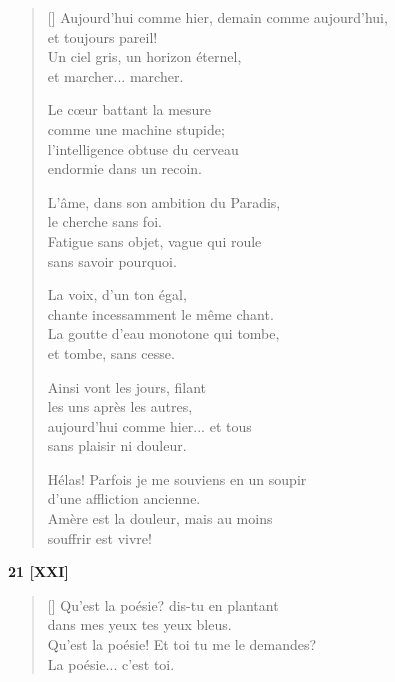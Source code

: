 \documentclass[a4paper,12pt]{book}
\begin{document}
\begin{verse}[\versewidth]
  Aujourd'hui comme hier, demain comme aujourd'hui, \\
  et toujours pareil! \\
  Un ciel gris, un horizon éternel, \\
  et marcher... marcher.

  Le cœur battant la mesure \\
  comme une machine stupide; \\
  l'intelligence obtuse du cerveau \\
  endormie dans un recoin.

  L'âme, dans son ambition du Paradis, \\
  le cherche sans foi. \\
  Fatigue sans objet, vague qui roule \\
  sans savoir pourquoi.

  La voix, d'un ton égal, \\
  chante incessamment le même chant. \\
  La goutte d'eau monotone qui tombe, \\
  et tombe, sans cesse.

  Ainsi vont les jours, filant \\
  les uns après les autres, \\
  aujourd'hui comme hier... et tous \\
  sans plaisir ni douleur.

  Hélas! Parfois je me souviens en un soupir \\
  d'une affliction ancienne. \\
  Amère est la douleur, mais au moins \\
  souffrir est vivre!
\end{verse}

\bigskip

\begin{center}
  \textbf{21 [XXI]}
\end{center}

\settowidth{\versewidth}{Qu'est la poésie! Et toi tu me le demandes?}

\begin{verse}[\versewidth]
  Qu'est la poésie? dis-tu en plantant \\
  dans mes yeux tes yeux bleus. \\
  Qu'est la poésie! Et toi tu me le demandes? \\
  La poésie... c'est toi.
\end{verse}
\end{document}
